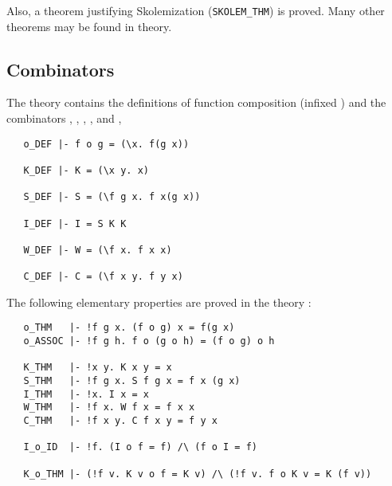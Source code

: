 Also, a theorem justifying Skolemization ({\small\verb+SKOLEM_THM+}) is
proved. Many other theorems may be found in  theory.

\subsection{Combinators}


The theory 
contains the definitions of function composition (infixed )
and the combinators
,
,
,
,
and ,

\begin{hol}
{\small
\begin{verbatim}
   o_DEF |- f o g = (\x. f(g x))

   K_DEF |- K = (\x y. x)

   S_DEF |- S = (\f g x. f x(g x))

   I_DEF |- I = S K K

   W_DEF |- W = (\f x. f x x)

   C_DEF |- C = (\f x y. f y x)
\end{verbatim}
}
\end{hol}

\noindent The following elementary properties are proved in the theory
:

\begin{hol}
\begin{verbatim}
   o_THM   |- !f g x. (f o g) x = f(g x)
   o_ASSOC |- !f g h. f o (g o h) = (f o g) o h

   K_THM   |- !x y. K x y = x
   S_THM   |- !f g x. S f g x = f x (g x)
   I_THM   |- !x. I x = x
   W_THM   |- !f x. W f x = f x x
   C_THM   |- !f x y. C f x y = f y x

   I_o_ID  |- !f. (I o f = f) /\ (f o I = f)

   K_o_THM |- (!f v. K v o f = K v) /\ (!f v. f o K v = K (f v))
\end{verbatim}
\end{hol}

